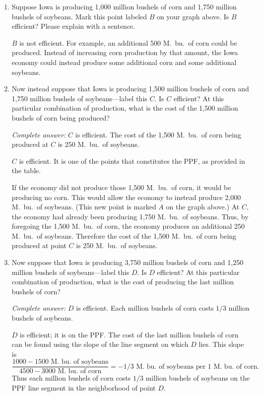\documentclass[
    letterpaper,paper=portrait,fleqn,
    DIV=16,fontsize=12pt,twoside=semi,
    parskip=full-,
    headings=standardclasses]
{scrartcl}
\begin{document}
\begin{enumerate}
\item Suppose Iowa is producing 1,000 million bushels of corn and 1,750 million bushels of soybeans. Mark this point labeled $B$ on your graph above. Is $B$ efficient? Please explain with a sentence.


\begin{solution}
$B$ is not efficient. For example, an additional 500 M.~bu.~of corn could be produced. Instead of increasing corn production by that amount, the Iowa economy could instead produce some additional corn and some additional soybeans.
\end{solution}

\item Now instead suppose that Iowa is producing 1,500 million bushels of corn and 1,750 million bushels of soybeans---label this $C$. Is $C$ efficient? At this particular combination of production, what is the cost of the 1,500 million bushels of corn being produced?

\begin{solution}
\emph{Complete answer:} $C$ is efficient. The cost of the 1,500 M.~bu.~of corn being produced at $C$ is 250 M.~bu.~of soybeans.

$C$ is efficient. It is one of the points that constitutes the PPF, as provided in the table.

If the economy did not produce those 1,500 M.~bu.~of corn, it would be producing no corn. This would allow the economy to instead produce 2,000 M.~bu.~of soybeans. (This new point is marked $A$ on the graph above.) At $C,$ the economy had already been producing 1,750 M.~bu.~of soybeans. Thus, by foregoing the 1,500 M.~bu.~of corn, the economy produces an additional 250 M.~bu.~of soybeans. Therefore the cost of the 1,500 M.~bu.~of corn being produced at point $C$ is 250 M.~bu.~of soybeans.
\end{solution}
\item Now suppose that Iowa is producing 3,750 million bushels of corn and 1,250 million bushels of soybeans---label this $D.$ Is $D$ efficient? At this particular combination of production, what is the cost of producing the last million bushels of corn?

\begin{solution}
\emph{Complete answer:} $D$ is efficient. Each million bushels of corn costs $1/3$ million bushels of soybeans.

$D$ is efficient; it is on the PPF. The cost of the last million bushels of corn can be found using the slope of the line segment on which $D$ lies. This slope is $$\frac{1000-1500\text{ M.~bu.~of soybeans}}{4500-3000\text{ M.~bu.~of corn}}=-1/3\text{ M.~bu.~of soybeans per 1 M.~bu.~of corn.}$$
Thus each million bushels of corn costs $1/3$ million bushels of soybeans on the PPF line segment in the neighborhood of point $D.$


\end{solution}
\end{enumerate}
\end{document}
